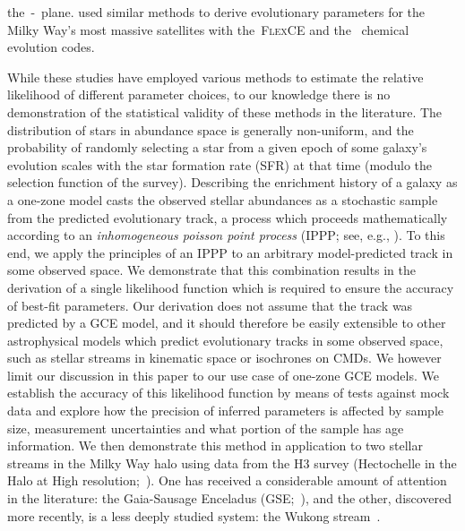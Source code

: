 \documentclass[ms.tex]{subfiles}
\begin{document}
the~\afe-\feh~plane.
\citet{Hasselquist2021} used similar methods to derive evolutionary parameters
for the Milky Way's most massive satellites with the~\textsc{FlexCE}
\citep{Andrews2017} and the~\citet{Lian2018, Lian2020} chemical evolution
codes.
\par
While these studies have employed various methods to estimate the relative
likelihood of different parameter choices, to our knowledge there is no
demonstration of the statistical validity of these methods in the literature.
The distribution of stars in abundance space is generally non-uniform, and the
probability of randomly selecting a star from a given epoch of some galaxy's
evolution scales with the star formation rate (SFR) at that time (modulo the
selection function of the survey).
Describing the enrichment history of a galaxy as a one-zone model casts the
observed stellar abundances as a stochastic sample from the predicted
evolutionary track, a process which proceeds mathematically according to an
\textit{inhomogeneous poisson point process} (IPPP; see, e.g.,
\citealt{Press2007}).
To this end, we apply the principles of an IPPP to an arbitrary model-predicted
track in some observed space.
We demonstrate that this combination results in the derivation of a single
likelihood function which is required to ensure the accuracy of best-fit
parameters.
Our derivation does not assume that the track was predicted by a GCE model,
and it should therefore be easily extensible to other astrophysical models
which predict evolutionary tracks in some observed space, such as stellar
streams in kinematic space or isochrones on CMDs.
We however limit our discussion in this paper to our use case of one-zone GCE
models.
We establish the accuracy of this likelihood function by means of tests
against mock data and explore how the precision of inferred parameters is
affected by sample size, measurement uncertainties and what portion of the
sample has age information.
We then demonstrate this method in application to two stellar streams in the
Milky Way halo using data from the H3 survey (Hectochelle in the Halo at High
resolution;~\citealp{Conroy2019}).
One has received a considerable amount of attention in the literature: the
Gaia-Sausage Enceladus (GSE;~\citealp{Belokurov2018, Helmi2018}), and the
other, discovered more recently, is a less deeply studied system: the Wukong
stream~\citep{Naidu2020, Naidu2022}.
\end{document}
